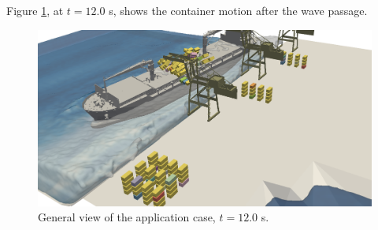 Figure \ref{fig:sines_t60}, at $t=12.0$ s, shows the container motion after the wave passage. 
\begin{figure}[H]
	\centering
	\includegraphics[width=0.95\linewidth]{Figures/6.Chapter/sines_t60_II} 
	\caption{General view of the application case, $t=12.0$ s.}
	\label{fig:sines_t60} 
\end{figure}
%

